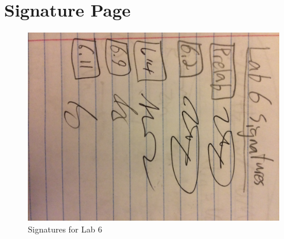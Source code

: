 \documentclass{article}
\begin{document}
\section{Signature Page}
    \begin{figure}[H]
        \centering
        \includegraphics[scale = 0.1, angle = -90]{IMG_0239.JPG}
        \caption{Signatures for Lab 6}
        \label{fig:my_label}
    \end{figure}
    
{}


    
\end{document}
